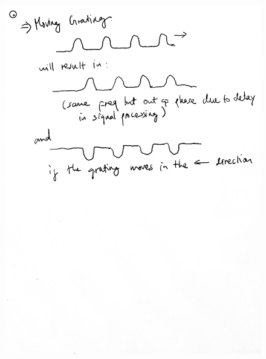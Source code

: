 \documentclass[letterpaper, 11pt]{article}
\begin{document}
\begin{figure}[htb!]
	\centering
	\includegraphics[width=0.7\linewidth]{4c.jpg}
\end{figure}





\end{document}
